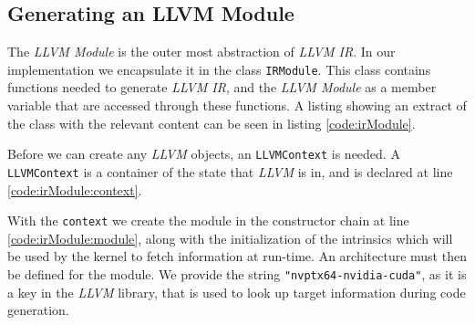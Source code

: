 \subsection{Generating an LLVM Module} \label{sec:irmodule}
The \textit{LLVM Module} is the outer most abstraction of \textit{LLVM IR}. In our implementation we encapsulate it in the class \texttt{IRModule}. This class contains functions needed to generate \textit{LLVM IR}, and the \textit{LLVM Module} as a member variable that are accessed through these functions. A listing showing an extract of the class with the relevant content can be seen in listing \ref{code:irModule}.

Before we can create any \textit{LLVM} objects, an \texttt{LLVMContext} is needed. A \texttt{LLVMContext} is a container of the state that \textit{LLVM} is in, and is declared at line \ref{code:irModule:context}.

With the \texttt{context} we create the module in the constructor chain at line \ref{code:irModule:module}, along with the initialization of the intrinsics which will be used by the kernel to fetch information at run-time. An architecture must then be defined for the module. We provide the string \texttt{"nvptx64-nvidia-cuda"}, as it is a key in the \textit{LLVM} library, that is used to look up target information during code generation. 

